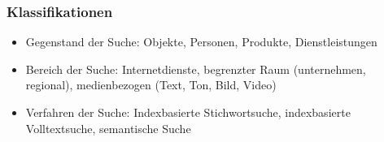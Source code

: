    \subsubsection*{Klassifikationen}
        \begin{itemize}
            \item Gegenstand der Suche: Objekte, Personen, Produkte, Dienstleistungen
            \item Bereich der Suche: Internetdienste, begrenzter Raum (unternehmen, regional), medienbezogen (Text, Ton, Bild, Video)
            \item Verfahren der Suche: Indexbasierte Stichwortsuche, indexbasierte Volltextsuche, semantische Suche
        \end{itemize}